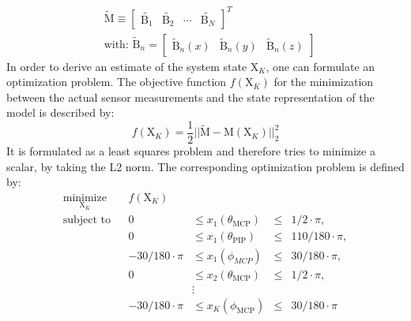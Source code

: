 \begin{equation}
\begin{aligned}
& \tilde{\mathrm{M}} \equiv \begin{bmatrix} \tilde{\mathrm{B}_{1}} & \tilde{\mathrm{B}_{2}} & \cdots & \tilde{\mathrm{B}_{N}} \end{bmatrix}^{T}\\[5pt]
& \text{with: }  \tilde{\mathrm{B}}_{n} = \begin{bmatrix} \tilde{\mathrm{B}}_{n}(x) & \tilde{\mathrm{B}}_{n}(y) & \tilde{\mathrm{B}}_{n}(z) \end{bmatrix}
\end{aligned}
\end{equation}
In order to derive an estimate of the system state $ \mathrm{X}_K $, one can formulate an optimization problem. The objective function $ f(\mathrm{X}_K) $ for the minimization between the actual sensor measurements and the state representation of the model is described by:
\begin{equation}
f(\mathrm{X}_K) = \frac{1}{2}|| \tilde{\mathrm{M}} - \mathrm{M}(\mathrm{X}_K) ||^{2}_{2}
\end{equation}
It is formulated as a least squares problem and therefore tries to minimize a scalar, by taking the L2 norm. The corresponding optimization problem is defined by:
\begin{equation} \label{eq:minimization}
\begin{aligned}
\underset{\mathrm{X}_K}{\text{minimize}} & & f(\mathrm{X}_K) \\
\text{subject to} & & 0 & \leq {x}_1(\theta_{\mathrm{MCP}}) & \leq & 1/2 \cdot \pi, \\
				  & & 0 & \leq {x}_1(\theta_{\mathrm{PIP}}) & \leq & 110/180 \cdot \pi, \\
				  & & -30/180 \cdot \pi & \leq {x}_1(\phi_{MCP}) & \leq & 30/180 \cdot \pi, \\
				  & & 0 & \leq {x}_2(\theta_{\mathrm{MCP}}) & \leq & 1/2 \cdot \pi, \\
				  & & & \vdots \\
				  & & -30/180 \cdot \pi & \leq {x}_K(\phi_{\mathrm{MCP}}) & \leq & 30/180 \cdot \pi
\end{aligned}
\end{equation}
